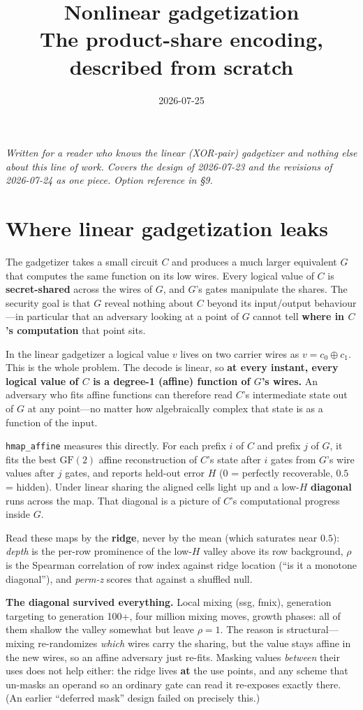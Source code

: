 \documentclass[11pt]{article}
\title{\textbf{Nonlinear gadgetization}\\[2pt]
\large The product-share encoding, described from scratch}
\author{}
\date{2026-07-25}
\newcommand{\xor}{\oplus}
\begin{document}
\maketitle

\noindent\emph{Written for a reader who knows the linear (XOR-pair) gadgetizer
and nothing else about this line of work. Covers the design of 2026-07-23 and
the revisions of 2026-07-24 as one piece. Option reference in \S9.}

\section{Where linear gadgetization leaks}

The gadgetizer takes a small circuit $C$ and produces a much larger equivalent
$G$ that computes the same function on its low wires. Every logical value of $C$
is \textbf{secret-shared} across the wires of $G$, and $G$'s gates manipulate the
shares. The security goal is that $G$ reveal nothing about $C$ beyond its
input/output behaviour---in particular that an adversary looking at a point of
$G$ cannot tell \textbf{where in $C$'s computation} that point sits.

In the linear gadgetizer a logical value $v$ lives on two carrier wires as
$v=c_0\xor c_1$. This is the whole problem. The decode is linear, so
\textbf{at every instant, every logical value of $C$ is a degree-1 (affine)
function of $G$'s wires.} An adversary who fits affine functions can therefore
read $C$'s intermediate state out of $G$ at any point---no matter how
algebraically complex that state is as a function of the input.

\texttt{hmap\_affine} measures this directly. For each prefix $i$ of $C$ and
prefix $j$ of $G$, it fits the best $\mathrm{GF}(2)$ affine reconstruction of
$C$'s state after $i$ gates from $G$'s wire values after $j$ gates, and reports
held-out error $H$ ($0$ = perfectly recoverable, $0.5$ = hidden). Under linear
sharing the aligned cells light up and a low-$H$ \textbf{diagonal} runs across
the map. That diagonal is a picture of $C$'s computational progress inside $G$.

Read these maps by the \textbf{ridge}, never by the mean (which saturates near
$0.5$): \emph{depth} is the per-row prominence of the low-$H$ valley above its
row background, $\rho$ is the Spearman correlation of row index against ridge
location (``is it a monotone diagonal''), and \emph{perm-z} scores that against
a shuffled null.

\textbf{The diagonal survived everything.} Local mixing (ssg, fmix), generation
targeting to generation 100+, four million mixing moves, growth phases: all of
them shallow the valley somewhat but leave $\rho=1$. The reason is
structural---mixing re-randomizes \emph{which} wires carry the sharing, but the
value stays affine in the new wires, so an affine adversary just re-fits.
Masking values \emph{between} their uses does not help either: the ridge lives
\textbf{at} the use points, and any scheme that un-masks an operand so an
ordinary gate can read it re-exposes exactly there. (An earlier ``deferred
mask'' design failed on precisely this.)
\end{document}
